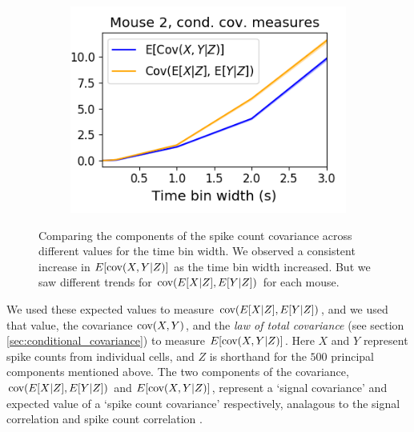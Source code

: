 \begin{figure}[h]
\begin{subfigure}[h]{0.5\linewidth}
      \includegraphics[width=\linewidth]{figures/eight_probe/Robbins_cond_cov_comparison.png}
      \label{fig:Robbins_cond_cov_comparison}
    \end{subfigure}
    \caption{Comparing the components of the spike count covariance across different values for the time bin width. We observed a consistent increase in $E[\text{cov} (X,Y|Z)]$ as the time bin width increased. But we saw different trends for $\text{cov} (E[X|Z], E[Y|Z])$ for each mouse.}
    \label{fig:conditional_covariance_comparison}
  \end{figure}

  We used these expected values to measure $\text{cov} (E[X|Z], E[Y|Z])$, and we used that value, the covariance $\text{cov} (X,Y)$, and the \textit{law of total covariance} (see section \ref{sec:conditional_covariance}) to measure $E[\text{cov} (X,Y|Z)]$. Here $X$ and $Y$ represent spike counts from individual cells, and $Z$ is shorthand for the $500$ principal components mentioned above. The two components of the covariance, $\text{cov} (E[X|Z], E[Y|Z])$ and $E[\text{cov} (X,Y|Z)]$, represent a `signal covariance' and expected value of a `spike count covariance' respectively, analagous to the signal correlation and spike count correlation \parencite{cohen2}.


